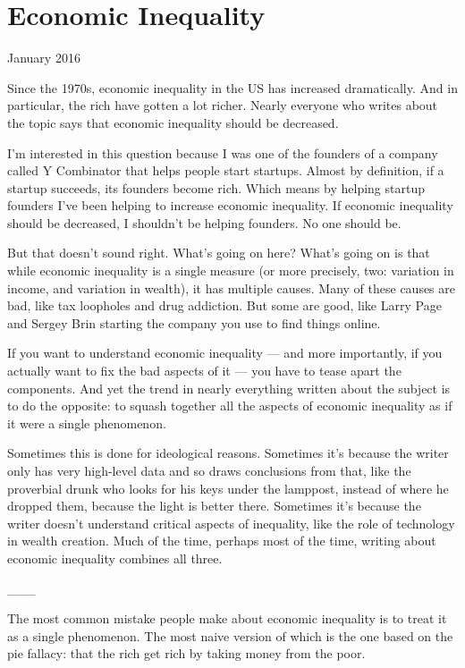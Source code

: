 \chapter{Economic Inequality}

January 2016

Since the 1970s, economic inequality in the US has increased
dramatically. And in particular, the rich have gotten a lot richer.
Nearly everyone who writes about the topic says that economic inequality
should be decreased.

I'm interested in this question because I was one of the founders of a
company called Y Combinator that helps people start startups. Almost by
definition, if a startup succeeds, its founders become rich. Which means
by helping startup founders I've been helping to increase economic
inequality. If economic inequality should be decreased, I shouldn't be
helping founders. No one should be.

But that doesn't sound right. What's going on here? What's going on is
that while economic inequality is a single measure (or more precisely,
two: variation in income, and variation in wealth), it has multiple
causes. Many of these causes are bad, like tax loopholes and drug
addiction. But some are good, like Larry Page and Sergey Brin starting
the company you use to find things online.

If you want to understand economic inequality --- and more importantly,
if you actually want to fix the bad aspects of it --- you have to tease
apart the components. And yet the trend in nearly everything written
about the subject is to do the opposite: to squash together all the
aspects of economic inequality as if it were a single phenomenon.

Sometimes this is done for ideological reasons. Sometimes it's because
the writer only has very high-level data and so draws conclusions from
that, like the proverbial drunk who looks for his keys under the
lamppost, instead of where he dropped them, because the light is better
there. Sometimes it's because the writer doesn't understand critical
aspects of inequality, like the role of technology in wealth creation.
Much of the time, perhaps most of the time, writing about economic
inequality combines all three.

\_\_\_

The most common mistake people make about economic inequality is to
treat it as a single phenomenon. The most naive version of which is the
one based on the pie fallacy: that the rich get rich by taking money
from the poor.

